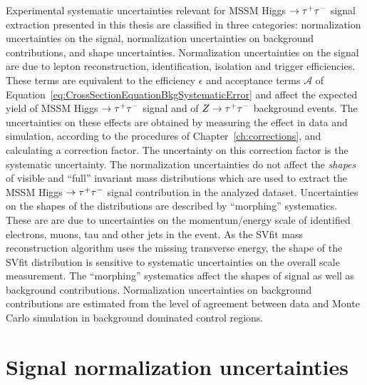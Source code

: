 Experimental systematic uncertainties relevant for MSSM Higgs $\to \tau^+\tau^-$ signal
extraction presented in this thesis are classified in three categories:
normalization uncertainties on the signal, normalization uncertainties on
background contributions, and shape uncertainties.  Normalization uncertainties
on the signal are due to lepton reconstruction, identification, isolation and
trigger efficiencies.  These terms are equivalent to the efficiency $\epsilon$
and acceptance terms $\mathcal{A}$ of
Equation~\ref{eq:CrossSectionEquationBkgSystematicError} and affect the expected
yield of MSSM Higgs $\to \tau^+\tau^-$ signal and of $Z \to \tau^+\tau^-$ background events.  The
uncertainties on these effects are obtained by measuring the effect in data and
simulation, according to the procedures of Chapter~\ref{ch:corrections}, and
calculating a correction factor.  The uncertainty on this correction factor is
the systematic uncertainty.  The normalization uncertainties do not affect the
\emph{shapes} of visible and ``full'' invariant mass distributions which are
used to extract the MSSM Higgs $\to \tau^+\tau^-$ signal contribution in the analyzed
dataset.  Uncertainties on the shapes of the distributions are described by
``morphing'' systematics.  These are are due to uncertainties on the
momentum/energy scale of identified electrons, muons, tau and other jets in the
event.  As the SVfit mass reconstruction algorithm uses the missing transverse
energy, the shape of the SVfit distribution is sensitive to systematic
uncertainties on the overall scale \MET measurement.  The ``morphing''
systematics affect the shapes of signal as well as background contributions.
Normalization uncertainties on background contributions are estimated from the
level of agreement between data and Monte Carlo simulation in background
dominated control regions.

\section{Signal normalization uncertainties}

